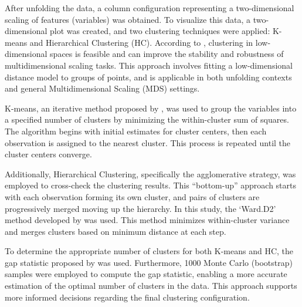After unfolding the data, a column configuration representing a two-dimensional scaling of features (variables) was obtained. To visualize this data, a two-dimensional plot was created, and two clustering techniques were applied: K-means and Hierarchical Clustering (HC). According to \citet{heiser1993clustering}, clustering in low-dimensional spaces is feasible and can improve the stability and robustness of multidimensional scaling tasks. This approach involves fitting a low-dimensional distance model to groups of points, and is applicable in both unfolding contexts and general Multidimensional Scaling (MDS) settings.

K-means, an iterative method proposed by \citet{hartigan1979algorithm}, was used to group the variables into a specified number of clusters by minimizing the within-cluster sum of squares. The algorithm begins with initial estimates for cluster centers, then each observation is assigned to the nearest cluster. This process is repeated until the cluster centers converge.

Additionally, Hierarchical Clustering, specifically the agglomerative strategy, was employed to cross-check the clustering results. This ``bottom-up'' approach starts with each observation forming its own cluster, and pairs of clusters are progressively merged moving up the hierarchy. In this study, the `Ward.D2' method developed by \citet{murtagh2014ward} was used. This method minimizes within-cluster variance and merges clusters based on minimum distance at each step.

To determine the appropriate number of clusters for both K-means and HC, the gap statistic proposed by \citet{tibshirani2001estimating} was used. Furthermore, 1000 Monte Carlo (bootstrap) samples were employed to compute the gap statistic, enabling a more accurate estimation of the optimal number of clusters in the data. This approach supports more informed decisions regarding the final clustering configuration.
